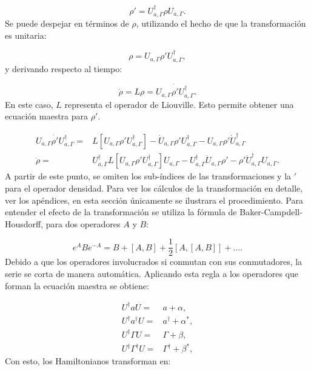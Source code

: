 \documentclass[a4paper,10pt]{report}
\begin{document}
\begin{equation}
\rho' = U_{a,\Gamma}^\dagger \rho U_{a,\Gamma}.
\end{equation} Se puede despejar en términos de $\rho$, utilizando el hecho de que la transformación es unitaria:

\begin{equation}
\rho = U_{a,\Gamma} \rho' U_{a,\Gamma}^\dagger,
\end{equation}y derivando respecto al tiempo:

\begin{equation}
\dot{\rho} = L\rho = \dot{U_{a,\Gamma} \rho' U_{a,\Gamma}^\dagger}.
\end{equation} En este caso, $L$ representa el operador de Liouville. Esto permite obtener una ecuación maestra para $\rho'$. 

\begin{align}
 U_{a,\Gamma} \dot{\rho'} U_{a,\Gamma}^\dagger =& L[U_{a,\Gamma} \rho' U_{a,\Gamma}^\dagger] - \dot{U}_{a,\Gamma}\rho'U_{a,\Gamma}^\dagger -U_{a,\Gamma} \rho' \dot{U}_{a,\Gamma}^\dagger\\
\dot{\rho} =& U_{a,\Gamma}^\dagger L[U_{a,\Gamma} \rho' U_{a,\Gamma}^\dagger]U_{a,\Gamma}-U_{a,\Gamma}^\dagger\dot{U}_{a,\Gamma}\rho'-\rho'\dot{U}_{a,\Gamma}^\dagger U_{a,\Gamma}.
\end{align}A partir de este punto, se omiten los sub-índices de las transformaciones y la $'$ para el operador densidad. Para ver los cálculos de la transformación en detalle, ver los apéndices, en esta sección únicamente se ilustrara el procedimiento. Para entender el efecto de la transformación se utiliza la fórmula de Baker-Campdell-Housdorff\cite{SakuraiQM}, para dos operadores $A$ y $B$:

\begin{equation}
e^{A} B e^{-A} = B + [A,B] + \frac{1}{2}[A,[A,B]] + ... .
\end{equation} Debido a que los operadores involucrados si conmutan con sus conmutadores, la serie se corta de manera automática. Aplicando esta regla a los operadores que forman la ecuación maestra se obtiene:

\begin{align}
U^{\dagger} a U =& a + \alpha, \\
U^{\dagger} a^{\dagger} U =& a^{\dagger} + \alpha^*, \\
U^{\dagger} \Gamma U =& \Gamma + \beta, \\
U^{\dagger} \Gamma^{\dagger} U =& \Gamma^{\dagger} + \beta^*, 
\end{align} Con esto, los Hamiltonianos transforman en:
\end{document}
